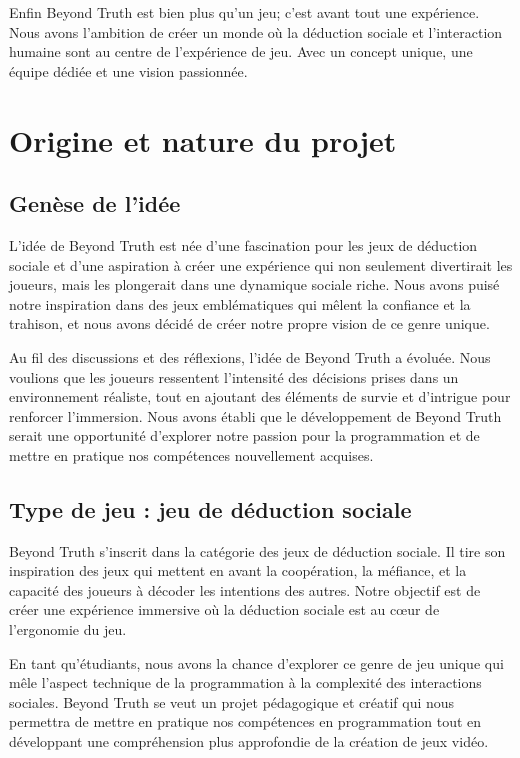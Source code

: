 \documentclass[
	article,			%
	11pt,				%
	oneside,			%
	a4paper,			%
	chapter=TITLE,
	french,			%
	sumario=tradicional
	]{base_nt}
\begin{document}
Enfin Beyond Truth est bien plus qu'un jeu; c'est avant tout une expérience. Nous avons l'ambition de créer un monde où la déduction sociale et l'interaction humaine sont au centre de l'expérience de jeu. Avec un concept unique, une équipe dédiée et une vision passionnée.

\section{Origine et nature du projet}

\subsection{Genèse de l'idée}

L'idée de Beyond Truth est née d'une fascination pour les jeux de déduction sociale et d'une aspiration à créer une expérience qui non seulement divertirait les joueurs, mais les plongerait dans une dynamique sociale riche. Nous avons puisé notre inspiration dans des jeux emblématiques qui mêlent la confiance et la trahison, et nous avons décidé de créer notre propre vision de ce genre unique.

Au fil des discussions et des réflexions, l'idée de Beyond Truth a évoluée. Nous voulions que les joueurs ressentent l'intensité des décisions prises dans un environnement réaliste, tout en ajoutant des éléments de survie et d'intrigue pour renforcer l'immersion. Nous avons établi que le développement de Beyond Truth serait une opportunité d'explorer notre passion pour la programmation et de mettre en pratique nos compétences nouvellement acquises.

\subsection{Type de jeu : jeu de déduction sociale}

Beyond Truth s'inscrit dans la catégorie des jeux de déduction sociale. Il tire son inspiration des jeux qui mettent en avant la coopération, la méfiance, et la capacité des joueurs à décoder les intentions des autres. Notre objectif est de créer une expérience immersive où la déduction sociale est au cœur de l'ergonomie du jeu.

En tant qu'étudiants, nous avons la chance d'explorer ce genre de jeu unique qui mêle l'aspect technique de la programmation à la complexité des interactions sociales. Beyond Truth se veut un projet pédagogique et créatif qui nous permettra de mettre en pratique nos compétences en programmation tout en développant une compréhension plus approfondie de la création de jeux vidéo.
\end{document}

